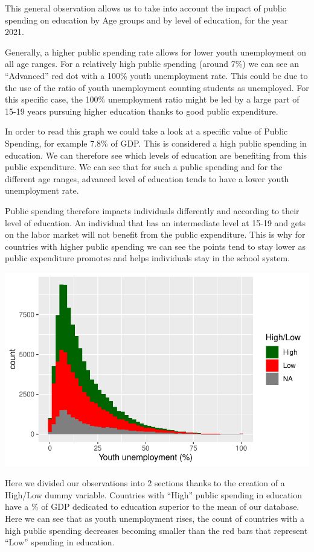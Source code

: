 \documentclass[
  letterpaper,
  DIV=11,
  numbers=noendperiod]{scrartcl}
\begin{document}
This general observation allows us to take into account the impact of
public spending on education by Age groups and by level of education,
for the year 2021.

Generally, a higher public spending rate allows for lower youth
unemployment on all age ranges. For a relatively high public spending
(around 7\%) we can see an ``Advanced'' red dot with a 100\% youth
unemployment rate. This could be due to the use of the ratio of youth
unemployment counting students as unemployed. For this specific case,
the 100\% unemployment ratio might be led by a large part of 15-19 years
pursuing higher education thanks to good public expenditure.

In order to read this graph we could take a look at a specific value of
Public Spending, for example 7.8\% of GDP. This is considered a high
public spending in education. We can therefore see which levels of
education are benefiting from this public expenditure. We can see that
for such a public spending and for the different age ranges, advanced
level of education tends to have a lower youth unemployment rate.

Public spending therefore impacts individuals differently and according
to their level of education. An individual that has an intermediate
level at 15-19 and gets on the labor market will not benefit from the
public expenditure. This is why for countries with higher public
spending we can see the points tend to stay lower as public expenditure
promotes and helps individuals stay in the school system.

\includegraphics{Projet-BM_files/figure-pdf/unnamed-chunk-19-1.pdf}

Here we divided our observations into 2 sections thanks to the creation
of a High/Low dummy variable. Countries with ``High'' public spending in
education have a \% of GDP dedicated to education superior to the mean
of our database. Here we can see that as youth unemployment rises, the
count of countries with a high public spending decreases becoming
smaller than the red bars that represent ``Low'' spending in education.
\end{document}
